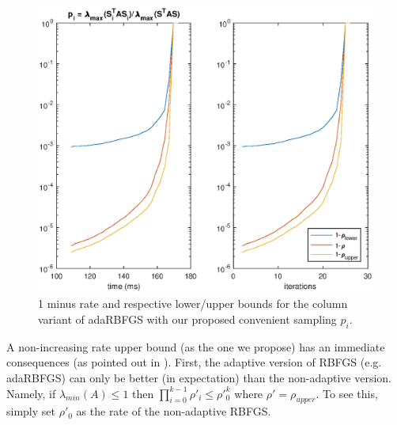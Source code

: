 \documentclass[12pt,conference,compsocconf]{IEEEtran}
\begin{document}
\begin{figure}[H]
  \centering
  \includegraphics[height=0.7\columnwidth,width=1.1\columnwidth]{ratemax.eps}
  
  \vspace{-2mm}
  \caption{1 minus rate and respective lower/upper bounds for the column variant of adaRBFGS with our proposed convenient sampling $p_i$. \label{fig:ratemax}}  
  
\end{figure}
A non-increasing rate upper bound (as the one we propose) has an immediate consequences (as pointed out in \cite{Stich1}). First, the adaptive version of RBFGS (e.g. adaRBFGS) can only be better (in expectation) than the non-adaptive version. Namely, if $\lambda_{min}(A) \leq 1$ then $\prod_{i=0}^{k-1}\rho\prime_{i} \leq \rho\prime^{k}_0$ where $\rho\prime=\rho_{upper}$. To see this, simply set $\rho\prime_0$ as the rate of the non-adaptive RBFGS.
\end{document}
